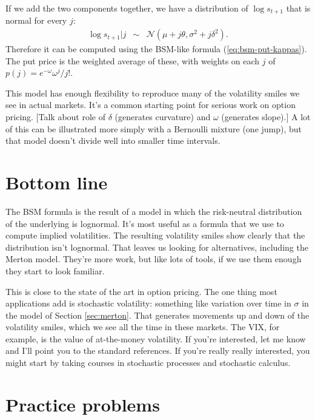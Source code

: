 \documentclass[11pt]{article}
\begin{document}
If we add the two components together, we have a distribution
of $\log s_{t+1}$ that is normal for every $j$:
\begin{eqnarray*}
    \log s_{t+1} | j &\sim& \mathcal{N}(\mu + j \theta, \sigma^2 + j \delta^2).
\end{eqnarray*}
Therefore it can be computed using the BSM-like formula (\ref{eq:bsm-put-kappas}).
The put price is the weighted average of these, with weights
on each $j$ of $p(j) = e^{-\omega} \omega^j / j!$.


This model has enough flexibility to reproduce many
of the volatility smiles we see in actual markets.
It's a common starting point for serious work on option pricing.
[Talk about role of $\delta$ (generates curvature)
and $\omega$ (generates slope).]
A lot of this can be illustrated more simply with a Bernoulli mixture (one jump),
but that model doesn't divide well into smaller time intervals.


\section*{Bottom line}

The BSM formula is the result of a model in which the risk-neutral distribution
of the underlying is lognormal.
It's most useful as a formula that we use to compute implied volatilities.
The resulting volatility smiles show clearly that the distribution
isn't lognormal.
That leaves us looking for alternatives, including the Merton model.
They're more work,
but like lots of tools, if we use them enough
they start to look familiar.

This is close to the state of the art in option pricing.
The one thing most applications add is stochastic volatility:
something like variation over time in $\sigma$ in the model of
Section \ref{sec:merton}.
That generates movements up and down of the volatility smiles,
which we see all the time in these markets.
The VIX, for example, is the value of at-the-money volatility.
If you're interested, let me know and I'll point you to the standard references.
If you're really really interested, you might start by taking
courses in stochastic processes and stochastic calculus.


\section*{Practice problems}
\end{document}
